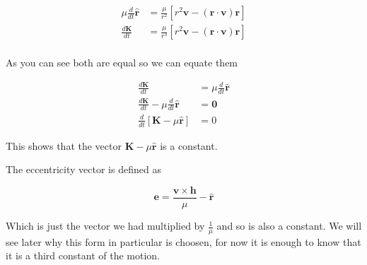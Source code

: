 \begin{align}
\mu \frac{d}{dt}\hat{\mathbf{r}} &= \frac{\mu}{r^2}\left[{r^2\mathbf{v}}-(\mathbf{r} \cdot \mathbf{v})\mathbf{r}\right] \nonumber \\
\frac{d \mathbf{K}}{dt} &= \frac{\mu}{r^3} \left[ r^2 \mathbf{v} - (\mathbf{r} \cdot \mathbf{v}) \mathbf{r} \right] \nonumber \\
\end{align}

As you can see both are equal so we can equate them

\begin{align}
\frac{d \mathbf{K}}{dt}  &= \mu \frac{d}{dt}\hat{\mathbf{r}}  \nonumber \\
\frac{d \mathbf{K}}{dt} - \mu \frac{d}{dt}\hat{\mathbf{r}} &= \mathbf{0}\nonumber \\
\frac{d}{dt}\left[\mathbf{K} - \mu \hat{\mathbf{r}}\right] &= 0
\end{align}

This shows that the vector $\mathbf{K} - \mu \hat{\mathbf{r}}$ is a constant.

The eccentricity vector is defined as

\begin{equation}
\mathbf{e} = \frac{\mathbf{v} \times \mathbf{h}}{\mu} - \hat{\mathbf{r}} \label{eq:gravity5}
\end{equation}

Which is just the vector we had multiplied by $\frac{1}{\mu}$ and so is also a constant.
We will see later why this form in particular is choosen, for now it is enough to know that
it is a third constant of the motion.